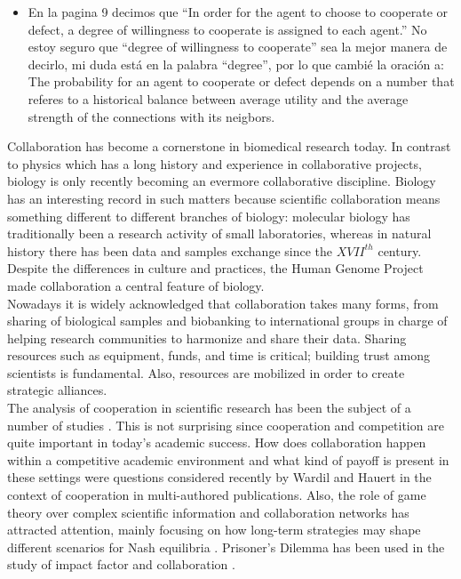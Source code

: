\documentclass[11pt]{article}
\begin{document}
\begin{itemize}
\item{En la pagina 9 decimos que ``In order for the agent to choose to cooperate
  or defect, a degree of willingness to cooperate is assigned to each agent.'' No estoy
  seguro que ``degree of willingness to cooperate'' sea la mejor manera de
  decirlo, mi duda está en la palabra ``degree'', por lo que cambi\'e la
  oraci\'on a: The probability for an agent to cooperate or defect depends on a
number that referes to a historical balance between average utility and the average strength of
the connections with its neigbors. }

  
\end{itemize}

Collaboration has become a cornerstone in biomedical research today.
In contrast to physics which has a long history and experience in
collaborative projects, biology is only recently becoming an evermore
collaborative discipline\cite{Vermeulen2013}. Biology has an
interesting record in such matters because scientific collaboration
means something different to different branches of biology: molecular
biology has traditionally been a research activity of small
laboratories\cite{KnorrCetina1999,Strasser2006}, whereas in natural
history there has been data and samples exchange since the $XVII^{th}$
century\cite{Muller2012,Strasser2012}. Despite the differences in
culture and practices, the Human Genome Project made collaboration a
central feature of biology.\\


Nowadays it is widely acknowledged that collaboration takes many
forms, from sharing of biological samples and biobanking to
international groups in charge of helping research communities to
harmonize and share their data. Sharing resources such as equipment,
funds, and time is critical; building trust among scientists is
fundamental. Also, resources are mobilized in order to create strategic alliances.\\


The analysis of cooperation in scientific research has been the subject of a
number of studies
\cite{Vermeulen2013,Newman2001,Newman2004,Elango2012,HernandezLemus2013,Strasser2006,Strasser2012}. This
is not surprising since cooperation and competition are quite important in
today's academic success. How does collaboration happen within a competitive
academic environment and what kind of payoff is present in these settings were
questions considered recently by Wardil and Hauert \cite{Wardil2015} in the
context of cooperation in multi-authored publications. Also, the role of game
theory over complex scientific information and collaboration networks has
attracted attention, mainly focusing on how long-term strategies may shape
different scenarios for Nash equilibria \cite{hanauske2012}. Prisoner's Dilemma
has been used in the study of impact factor and collaboration
\cite{Hara_etal_2002,Lieberman_etal_2005}. \\  
\end{document}
